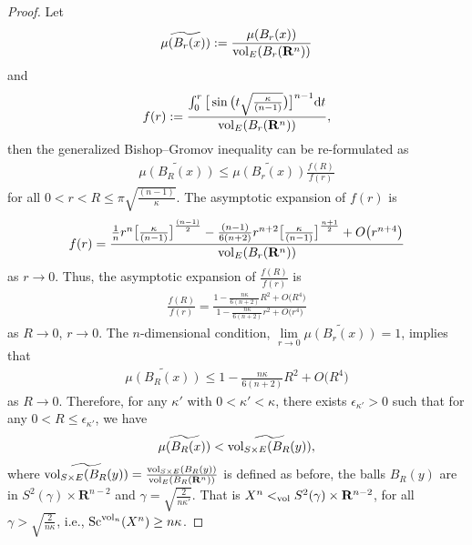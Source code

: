 \documentclass[pdftex]{sigma}
\begin{document}
\begin{proof}
Let
\begin{gather*}
\widetilde{\mu(B_r(x))}:=\frac{\mu(B_r(x))}{{\rm vol}_E(B_r(\mathbf{R}^n))}
\end{gather*}
 and
 \begin{gather*}
 f(r):= \frac{\int_0^r \big[\sin\big(t\sqrt{\frac{\kappa}{(n-1)}}\big)\big] ^{n-1}{\rm d}t}{{\rm vol}_E(B_r(\mathbf{R}^n))},
 \end{gather*}
 then the generalized Bishop--Gromov inequality can be re-formulated as
 \begin{gather*}
 \widetilde{\mu(B_R(x))} \leq \widetilde{\mu(B_r(x))} \frac{f(R)}{f(r)}
 \end{gather*}
 for all $ 0< r <R\leq \pi \sqrt{\frac{(n-1)}{\kappa}}$. The asymptotic expansion of $f(r)$ is
\begin{gather*}
f(r)= \frac{\frac{1}{n}r^n\big[\frac{\kappa}{(n-1)}\big]^{\frac{(n-1)}{2}}-\frac{(n-1)}{6(n+2)}r^{n+2} \big[\frac{\kappa}{(n-1)}\big]^{\frac{n+1}{2}}+O\big(r^{n+4}\big)}{{\rm vol}_E(B_r(\mathbf{R}^n))}
\end{gather*}
as $ r\rightarrow 0$.
 Thus, the asymptotic expansion of $\frac{f(R)}{f(r)}$ is
 \begin{gather*}
 \frac{f(R)}{f(r)}= \frac{1-\frac{n\kappa}{6(n+2)}R^2+ O\big(R^4\big)}{1-\frac{n\kappa}{6(n+2)}r^2+ O\big(r^4\big)}
 \end{gather*}
 as $R \to 0$, $r \to 0$.
 The $n$-dimensional condition, $\lim\limits_{r\to 0} \widetilde{\mu(B_r(x))}=1$, implies that
 \begin{gather*}
 \widetilde{\mu(B_R(x))}\leq 1-\frac{n\kappa}{6(n+2)}R^2+ O\big(R^4\big)
 \end{gather*}
as $R\to 0$. Therefore, for any $\kappa'$ with $0<\kappa' < \kappa$, there exists $\epsilon_{\kappa'} >0$ such that for any $0<R\leq \epsilon_{\kappa'}$, we have
 \begin{gather*}
\widetilde{\mu(B_R(x))}<\widetilde{{\rm vol}_{S\times E}(B_{R}(y))},
 \end{gather*}
where $\widetilde{{\rm vol}_{S\times E}(B_{R}(y))}= \frac{ {\rm vol}_{S\times E}(B_{R}(y))}{{\rm vol}_E(B_{R}(\mathbf{R}^n))}$ is defined as before, the balls $B_{R}(y)$ are in $S^2(\gamma)\times \mathbf{R}^{n-2}$ and $\gamma=\sqrt{\frac{2}{n\kappa'}}$.
That is $X^n <_{\rm vol} S^2(\gamma)\times \mathbf{R}^{n-2}$, for all $\gamma>\sqrt{\frac{2}{n\kappa}}$, i.e., ${\rm Sc}^{{\rm vol}_n}(X^n)\geq n\kappa$.


\end{proof}
\end{document}
